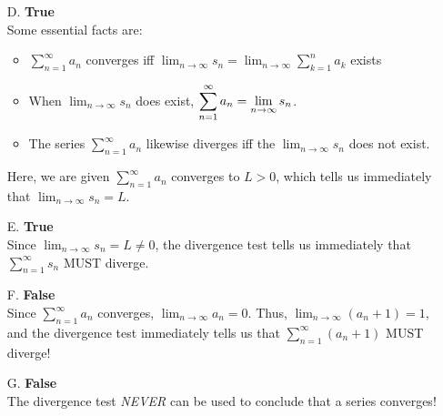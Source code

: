 \documentclass[noinstructornotes]{ximera}
\begin{document}
\begin{problem}
\begin{freeResponse}
\begin{itemize}
\item[D.] \textbf{True} \\ Some essential facts are:
\begin{itemize}
\item $\displaystyle \sum^{\infty}_{n= 1} a_n$ converges iff $\displaystyle \lim_{n \rightarrow \infty} s_n = \lim_{n \rightarrow \infty} \displaystyle  \sum^n_{k=1} a_k$ exists

\item When $\displaystyle \lim_{n\rightarrow \infty} s_n$ does exist, $\displaystyle \displaystyle \sum^{\infty}_{n= 1} a_n = \lim_{n \rightarrow \infty} s_n$.  


\item The series $\displaystyle \sum^{\infty}_{n= 1} a_n$ likewise diverges iff the $\displaystyle \lim_{n\rightarrow \infty} s_n$ does not exist.
\end{itemize}
Here, we are given $\displaystyle \sum^{\infty}_{n= 1} a_n$ converges to $L>0$, which tells us immediately that $\displaystyle \lim_{n\rightarrow \infty} s_n = L$.


\item[E.] \textbf{True} \\ Since $\displaystyle \lim_{n\rightarrow \infty} s_n = L \neq 0$, the divergence test tells us immediately that $\displaystyle \sum^{\infty}_{n=1} s_n$ MUST diverge.

\item[F.] \textbf{False} \\ Since $\displaystyle \sum^{\infty}_{n=1} a_n$ converges, $\displaystyle \lim_{n \rightarrow \infty} a_n = 0$.  Thus, $\displaystyle \lim_{n \rightarrow \infty} (a_n+1) = 1$, and the divergence test immediately tells us that  $\displaystyle \sum^{\infty}_{n=1} (a_n+1)$ MUST diverge!

\item[G.] \textbf{False} \\ The divergence test \emph{NEVER} can be used to conclude that a series converges! 

\vspace{3mm}


\end{itemize}
\end{freeResponse}
\end{problem}
\end{document}

